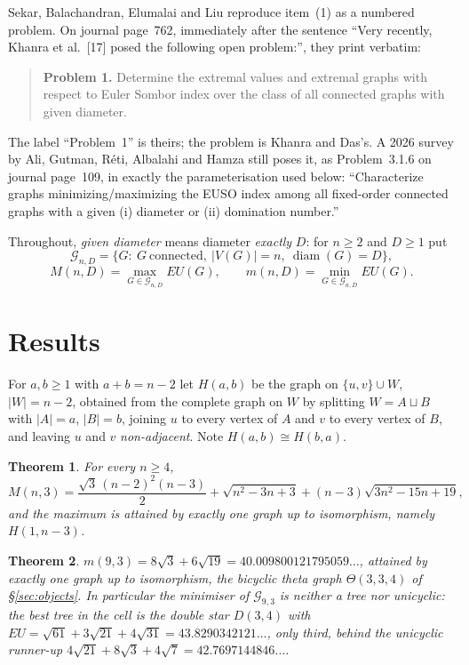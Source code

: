 \documentclass[11pt]{amsart}
\newtheorem{theorem}{Theorem}
\theoremstyle{remark}
\DeclareMathOperator{\diam}{diam}
\newcommand{\EU}{\mathit{EU}}
\newcommand{\Gnd}{\mathcal G}
\begin{document}
Sekar, Balachandran, Elumalai and Liu \cite{Sekar} reproduce item~(1) as a
numbered problem. On journal page~762, immediately after the sentence ``Very
recently, Khanra et al.\ [17] posed the following open problem:'', they print
verbatim:

\begin{quote}
\textbf{Problem 1.} Determine the extremal values and extremal graphs with
respect to Euler Sombor index over the class of all connected graphs with given
diameter.
\end{quote}

The label ``Problem~1'' is theirs; the problem is Khanra and Das's. A 2026
survey by Ali, Gutman, R\'eti, Albalahi and Hamza \cite{Survey} still poses it,
as Problem~3.1.6 on journal page~109, in exactly the parameterisation used
below: ``Characterize graphs minimizing/maximizing the EUSO index among all
fixed-order connected graphs with a given (i) diameter or (ii) domination
number.''

Throughout, \emph{given diameter} means diameter \emph{exactly} $D$: for
$n\ge2$ and $D\ge1$ put
\[
 \Gnd_{n,D}=\{G:\ G\ \text{connected},\ |V(G)|=n,\ \diam(G)=D\},
\]
\[
 M(n,D)=\max_{G\in\Gnd_{n,D}}\EU(G),
 \qquad
 m(n,D)=\min_{G\in\Gnd_{n,D}}\EU(G).
\]

\section{Results}

For $a,b\ge1$ with $a+b=n-2$ let $H(a,b)$ be the graph on
$\{u,v\}\cup W$, $|W|=n-2$, obtained from the complete graph on $W$ by
splitting $W=A\sqcup B$ with $|A|=a$, $|B|=b$, joining $u$ to every vertex of
$A$ and $v$ to every vertex of $B$, and leaving $u$ and $v$
\emph{non-adjacent}. Note $H(a,b)\cong H(b,a)$.

\begin{theorem}\label{thm:B}
For every $n\ge4$,
\[
 M(n,3)=\frac{\sqrt3\,(n-2)^2(n-3)}{2}
        +\sqrt{n^2-3n+3}
        +(n-3)\sqrt{3n^2-15n+19},
\]
and the maximum is attained by exactly one graph up to isomorphism, namely
$H(1,n-3)$.
\end{theorem}

\begin{theorem}\label{thm:A}
$m(9,3)=8\sqrt3+6\sqrt{19}=40.009800121795059\ldots$, attained by exactly one
graph up to isomorphism, the bicyclic theta graph $\Theta(3,3,4)$ of
\S\ref{sec:objects}. In particular the minimiser of $\Gnd_{9,3}$ is neither a
tree nor unicyclic: the best tree in the cell is the double star $D(3,4)$ with
$\EU=\sqrt{61}+3\sqrt{21}+4\sqrt{31}=43.8290342121\ldots$, only third, behind
the unicyclic runner-up $4\sqrt{21}+8\sqrt3+4\sqrt7=42.7697144846\ldots$.
\end{theorem}
\end{document}
